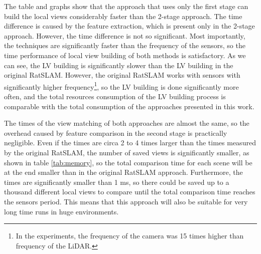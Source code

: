 The table and graphs show that the approach that uses only the first stage can build the local views considerably faster than the 2-stage approach. The time difference is caused by the feature extraction, which is present only in the 2-stage approach. However, the time difference is not so significant. Most importantly, the techniques are significantly faster than the frequency of the sensors, so the time performance of local view building of both methods is satisfactory. As we can see, the LV building is significantly slower than the LV building in the original RatSLAM. However, the original RatSLAM works with sensors with significantly higher frequency\footnote{In the experiments, the frequency of the camera was 15 times higher than frequency of the LiDAR.}, so the LV building is done significantly more often, and the total resources consumption of the LV building process is comparable with the total consumption of the approaches presented in this work.\par
The times of the view matching of both approaches are almost the same, so the overhead caused by feature comparison in the second stage is practically negligible. Even if the times are circa 2 to 4 times larger than the times measured by the original RatSLAM, the number of saved views is significantly smaller, as shown in table \ref{tab:memory}, so the total comparison time for each scene will be at the end smaller than in the original RatSLAM approach. Furthermore, the times are significantly smaller than 1 ms, so there could be saved up to a thousand different local views to compare until the total comparison time reaches the sensors period. This means that this approach will also be suitable for very long time runs in huge environments.
